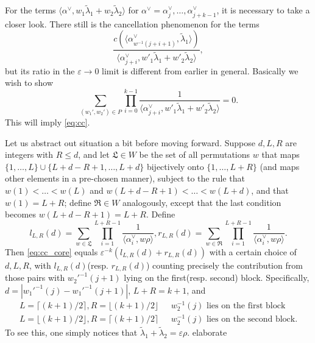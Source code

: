 \documentclass[11pt]{amsart}
\numberwithin{theorem}{section}
\numberwithin{equation}{section}
\theoremstyle{remark}
\theoremstyle{definition}
\begin{document}
{For the terms $\langle \alpha^\vee,w_1\tilde\lambda_1+w_2\tilde\lambda_2\rangle$ for $\alpha^\vee=\alpha^\vee_j,\ldots,\alpha^\vee_{j+k-1}$, it is necessary to take a closer look. There still is the cancellation phenomenon for the terms
\begin{equation*}
\frac{c(\langle \alpha^\vee_{w^{-1}(j+i+1)},\tilde\lambda_1\rangle)}{\langle \alpha^\vee_{j+i},w'_1\tilde\lambda_1+ w'_2\tilde\lambda_2\rangle},
\end{equation*}
but its ratio in the $\varepsilon\rightarrow0$ limit is different from earlier in general. Basically we wish to show
\begin{equation} \label{eq:cc_core}
\sum_{(w_1',w_2') \in P} \prod_{i=0}^{k-1}\frac{1}{\langle \alpha^\vee_{j+i},w'_1\tilde\lambda_1+w'_2\tilde\lambda_2 \rangle} = 0.
\end{equation}
This will imply \eqref{eq:cc}.


Let us abstract out situation a bit before moving forward. 
Suppose $d,L,R$ are integers with $R \leq d$, and let $\mathfrak L\in W$ be the set of all permutations $w$ that maps $\{1,\ldots,L\} \cup \{L+d-R+1, \ldots,L+d\}$ bijectively onto $\{1,\ldots,L+R\}$ (and maps other elements in a pre-chosen manner), subject to the rule that $w(1)<\ldots<w(L)$ and $w(L+d-R+1)<\ldots<w(L+d)$, and that $w(1)=L+R$; define $\mathfrak R\in W$ analogously, except that the last condition becomes $w(L+d-R+1)=L+R$. Define
\begin{equation*}
l_{L,R}(d) = \sum_{w \in \mathfrak L}\prod_{i=1}^{L+R-1}\frac{1}{\langle \alpha^\vee_i,w\rho\rangle}, r_{L,R}(d) = \sum_{w \in \mathfrak R}\prod_{i=1}^{L+R-1}\frac{1}{\langle \alpha^\vee_i,w\rho\rangle}.
\end{equation*}
Then \eqref{eq:cc_core} equals $\varepsilon^{-k}(l_{L,R}(d)+r_{L,R}(d))$ with a certain choice of $d,L,R$, with $l_{L,R}(d)$(resp. $r_{L,R}(d)$) counting precisely the contribution from those pairs with $w_2'^{-1}(j+1)$ lying on the first(resp. second) block. Specifically, $d = |w_1'^{-1}(j)-w_1'^{-1}(j+1)|$, $L+R = k+1$, and
\begin{align*}
L=\lceil (k+1)/2\rceil, R=\lfloor (k+1)/2\rfloor &\mbox{ $w_2^{-1}(j)$ lies on the first block}\\
L=\lfloor (k+1)/2\rfloor, R=\lceil (k+1)/2\rceil &\mbox{ $w_2^{-1}(j)$ lies on the second block}.
\end{align*}
To see this, one simply notices that $\tilde\lambda_1+\tilde\lambda_2=\varepsilon\rho$. {\color{red} elaborate}

}
\end{document}
